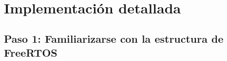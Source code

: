 \chapter{Implementación detallada}
\label{chap:Implementación}


\section{Paso 1: Familiarizarse con la estructura de FreeRTOS}

